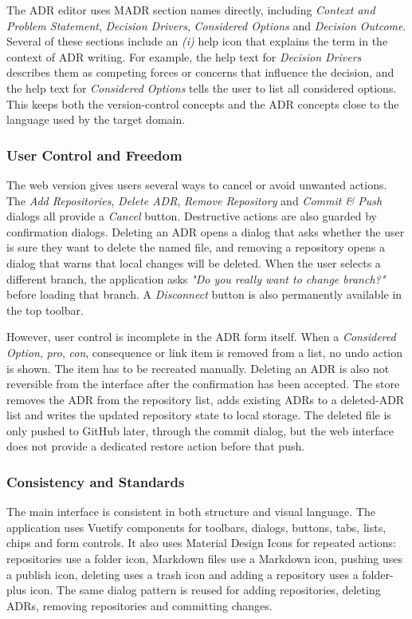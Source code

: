 \documentclass{article}
\begin{document}
The ADR editor uses MADR section names directly, including \textit{Context and Problem Statement}, \textit{Decision Drivers}, \textit{Considered Options} and \textit{Decision Outcome}. Several of these sections include an \textit{(i)} help icon that explains the term in the context of ADR writing. For example, the help text for \textit{Decision Drivers} describes them as competing forces or concerns that influence the decision, and the help text for \textit{Considered Options} tells the user to list all considered options. This keeps both the version-control concepts and the ADR concepts close to the language used by the target domain.

\subsubsection{User Control and Freedom}
The web version gives users several ways to cancel or avoid unwanted actions. The \textit{Add Repositories}, \textit{Delete ADR}, \textit{Remove Repository} and \textit{Commit \& Push} dialogs all provide a \textit{Cancel} button. Destructive actions are also guarded by confirmation dialogs. Deleting an ADR opens a dialog that asks whether the user is sure they want to delete the named file, and removing a repository opens a dialog that warns that local changes will be deleted. When the user selects a different branch, the application asks \textit{"Do you really want to change branch?"} before loading that branch. A \textit{Disconnect} button is also permanently available in the top toolbar.

However, user control is incomplete in the ADR form itself. When a \textit{Considered Option}, \textit{pro}, \textit{con}, consequence or link item is removed from a list, no undo action is shown. The item has to be recreated manually. Deleting an ADR is also not reversible from the interface after the confirmation has been accepted. The store removes the ADR from the repository list, adds existing ADRs to a deleted-ADR list and writes the updated repository state to local storage. The deleted file is only pushed to GitHub later, through the commit dialog, but the web interface does not provide a dedicated restore action before that push.

\subsubsection{Consistency and Standards}
The main interface is consistent in both structure and visual language. The application uses Vuetify components for toolbars, dialogs, buttons, tabs, lists, chips and form controls. It also uses Material Design Icons for repeated actions: repositories use a folder icon, Markdown files use a Markdown icon, pushing uses a publish icon, deleting uses a trash icon and adding a repository uses a folder-plus icon. The same dialog pattern is reused for adding repositories, deleting ADRs, removing repositories and committing changes.
\end{document}
